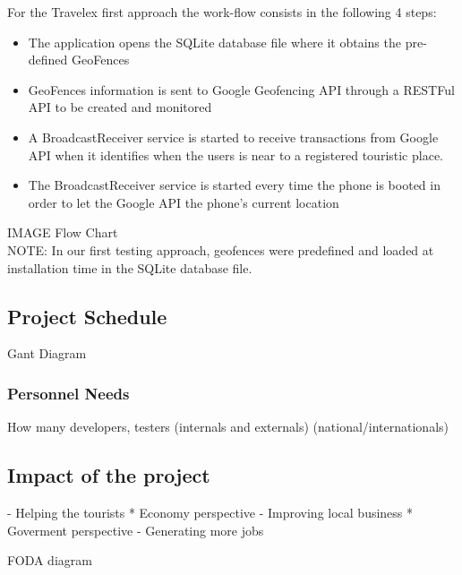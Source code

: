 For the  Travelex first approach the work-flow consists in the following 4 steps:\\

\begin{itemize}
  \item The application opens the  SQLite database file where it obtains the pre-defined GeoFences
  \item GeoFences information is sent to Google Geofencing API through a RESTFul API to be created and monitored
  \item A BroadcastReceiver service is started to receive transactions from Google API when it identifies when
        the users is near to a registered touristic place.
  \item The BroadcastReceiver service is started every time the phone is booted in order to let the Google API the phone's
        current location
\end{itemize}

IMAGE Flow Chart\\

NOTE: In our first testing approach, geofences were predefined and loaded at installation time in the SQLite 
database file.

\subsection{Project Schedule}
Gant Diagram

\subsubsection{Personnel Needs}
How many developers, testers (internals and externals)
(national/internationals)

\subsection{Impact of the project}
- Helping the tourists
* Economy perspective
- Improving local business 
* Goverment perspective
- Generating more jobs

FODA diagram



